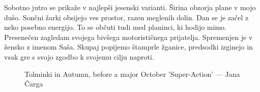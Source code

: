   Sobotno jutro se prikaže v najlepši jesenski varianti. Širina obzorja plane v mojo dušo. Sončni žarki obsijejo ves prostor, razen meglenih dolin. Dan se je začel z neko posebno energijo. To se občuti tudi med planinci, ki hodijo mimo. Presenečen zagledam svojega bivšega motorističnega prijatelja. Spremenjen je v žensko z imenom Saša. Skupaj popijemo štamprle žganice, predsodki izginejo in vsak gre s svojo zgodbo k svojemu cilju naproti. 
  
\begin{figure}[t!]
\checkoddpage \ifoddpage \forcerectofloat \else \forceversofloat \fi
\centering
{}
\caption{Tolminki \protect{} in Autumn, before a major October 'Super-Action' --- Jana Čarga }
\label{migovec in autumn}
\end{figure}

